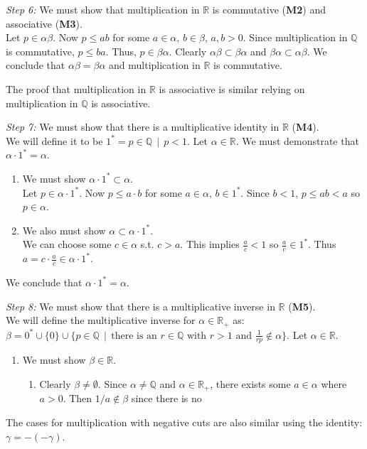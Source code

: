 \documentclass[../main.tex]{subfiles}
\begin{document}
\emph{Step 6:} We must show that multiplication in \( \mathbb{R} \) is commutative (\textbf{M2}) and associative (\textbf{M3}). \\
Let \( p \in \alpha\beta \). Now \( p \leq ab \) for some \( a \in \alpha, \, b \in \beta, \, a,b>0 \).
Since multiplication in \( \mathbb{Q} \) is commutative, \( p \leq ba \). Thus, \( p \in \beta\alpha \).
Clearly \( \alpha\beta \subset \beta\alpha \) and \( \beta\alpha \subset \alpha\beta \).
We conclude that \( \alpha\beta = \beta\alpha \) and multiplication in \( \mathbb{R} \) is commutative.

The proof that multiplication in \( \mathbb{R} \) is associative is similar relying on multiplication in \( \mathbb{Q} \) is associative.

\emph{Step 7:} We must show that there is a multiplicative identity in \( \mathbb{R} \) (\textbf{M4}). \\
We will define it to be \( 1^* = {p \in \mathbb{Q} \, \mid \, p < 1 } \).
Let \( \alpha \in \mathbb{R} \).
We must demonstrate that \( \alpha \cdot 1^* = \alpha \).
\begin{enumerate}
    \item We must show \( \alpha \cdot 1^* \subset \alpha \). \\
    Let \( p \in \alpha \cdot 1^* \). Now \( p \leq a \cdot b \) for some \( a \in \alpha, \, b \in 1^* \).
    Since \( b < 1 \), \( p \leq ab < a \) so \( p \in \alpha \).

    \item We also must show \( \alpha \subset \alpha \cdot 1^* \). \\
    We can choose some \( c \in \alpha \) s.t. \( c > a \).
    This implies \( \displaystyle \frac{a}{c} < 1 \) so \( \displaystyle \frac{a}{c} \in 1^* \).
    Thus \( \displaystyle a = c \cdot \frac{a}{c} \in \alpha \cdot 1^* \).
\end{enumerate}
We conclude that \( \alpha \cdot 1^* = \alpha \).

\emph{Step 8:} We must show that there is a multiplicative inverse in \( \mathbb{R} \) (\textbf{M5}). \\
We will define the multiplicative inverse for \( \alpha \in \mathbb{R}_+ \) as: \\
\( \beta = 0^* \cup \{0\} \cup \{ p \in \mathbb{Q} \, \mid \, \text{there is an } r \in \mathbb{Q} \text{ with } r>1 \text{ and } \frac{1}{rp} \notin \alpha \} \).
Let \( \alpha \in \mathbb{R} \).
\begin{enumerate}
    \item We must show \( \beta \in \mathbb{R} \).
    \begin{enumerate}[label=\roman*.]
        \item Clearly \( \beta \neq \emptyset \). Since \( \alpha \neq \mathbb{Q} \) and \( \alpha \in \mathbb{R}_+ \), there exists some \( a \in \alpha \) where \( a > 0 \).
        Then \( 1/a \notin \beta \) since there is no
    \end{enumerate}
\end{enumerate}

The cases for multiplication with negative cuts are also similar using the identity: \( \gamma = -(-\gamma) \).
\end{document}
